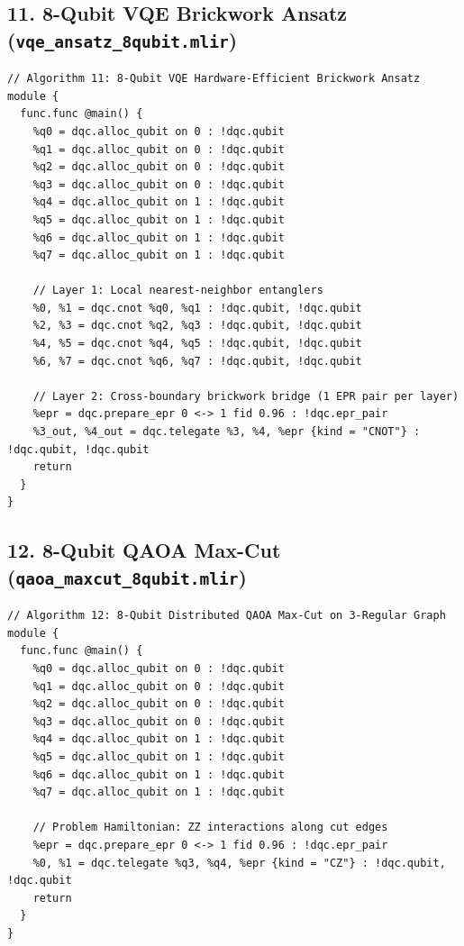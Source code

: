 \subsection{11. 8-Qubit VQE Brickwork Ansatz (\texttt{vqe\_ansatz\_8qubit.mlir})}
\begin{lstlisting}[language=MLIR, caption={vqe\_ansatz\_8qubit.mlir}]
// Algorithm 11: 8-Qubit VQE Hardware-Efficient Brickwork Ansatz
module {
  func.func @main() {
    %q0 = dqc.alloc_qubit on 0 : !dqc.qubit
    %q1 = dqc.alloc_qubit on 0 : !dqc.qubit
    %q2 = dqc.alloc_qubit on 0 : !dqc.qubit
    %q3 = dqc.alloc_qubit on 0 : !dqc.qubit
    %q4 = dqc.alloc_qubit on 1 : !dqc.qubit
    %q5 = dqc.alloc_qubit on 1 : !dqc.qubit
    %q6 = dqc.alloc_qubit on 1 : !dqc.qubit
    %q7 = dqc.alloc_qubit on 1 : !dqc.qubit

    // Layer 1: Local nearest-neighbor entanglers
    %0, %1 = dqc.cnot %q0, %q1 : !dqc.qubit, !dqc.qubit
    %2, %3 = dqc.cnot %q2, %q3 : !dqc.qubit, !dqc.qubit
    %4, %5 = dqc.cnot %q4, %q5 : !dqc.qubit, !dqc.qubit
    %6, %7 = dqc.cnot %q6, %q7 : !dqc.qubit, !dqc.qubit

    // Layer 2: Cross-boundary brickwork bridge (1 EPR pair per layer)
    %epr = dqc.prepare_epr 0 <-> 1 fid 0.96 : !dqc.epr_pair
    %3_out, %4_out = dqc.telegate %3, %4, %epr {kind = "CNOT"} : !dqc.qubit, !dqc.qubit
    return
  }
}
\end{lstlisting}

\subsection{12. 8-Qubit QAOA Max-Cut (\texttt{qaoa\_maxcut\_8qubit.mlir})}
\begin{lstlisting}[language=MLIR, caption={qaoa\_maxcut\_8qubit.mlir}]
// Algorithm 12: 8-Qubit Distributed QAOA Max-Cut on 3-Regular Graph
module {
  func.func @main() {
    %q0 = dqc.alloc_qubit on 0 : !dqc.qubit
    %q1 = dqc.alloc_qubit on 0 : !dqc.qubit
    %q2 = dqc.alloc_qubit on 0 : !dqc.qubit
    %q3 = dqc.alloc_qubit on 0 : !dqc.qubit
    %q4 = dqc.alloc_qubit on 1 : !dqc.qubit
    %q5 = dqc.alloc_qubit on 1 : !dqc.qubit
    %q6 = dqc.alloc_qubit on 1 : !dqc.qubit
    %q7 = dqc.alloc_qubit on 1 : !dqc.qubit

    // Problem Hamiltonian: ZZ interactions along cut edges
    %epr = dqc.prepare_epr 0 <-> 1 fid 0.96 : !dqc.epr_pair
    %0, %1 = dqc.telegate %q3, %q4, %epr {kind = "CZ"} : !dqc.qubit, !dqc.qubit
    return
  }
}
\end{lstlisting}

